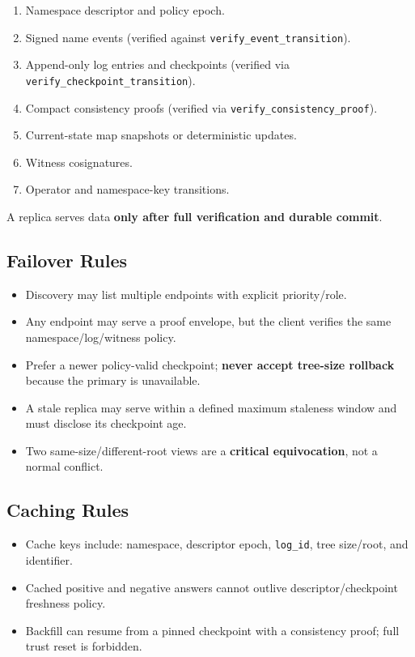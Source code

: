 \documentclass[
]{article}
\providecommand{\tightlist}{%
  \setlength{\itemsep}{0pt}\setlength{\parskip}{0pt}}
\begin{document}
\begin{enumerate}
\def\labelenumi{\arabic{enumi}.}
\tightlist
\item
  Namespace descriptor and policy epoch.
\item
  Signed name events (verified against
  \texttt{verify\_event\_transition}).
\item
  Append-only log entries and checkpoints (verified via
  \texttt{verify\_checkpoint\_transition}).
\item
  Compact consistency proofs (verified via
  \texttt{verify\_consistency\_proof}).
\item
  Current-state map snapshots or deterministic updates.
\item
  Witness cosignatures.
\item
  Operator and namespace-key transitions.
\end{enumerate}

A replica serves data \textbf{only after full verification and durable
commit}.

\hypertarget{failover-rules}{%
\subsection{Failover Rules}\label{failover-rules}}

\begin{itemize}
\tightlist
\item
  Discovery may list multiple endpoints with explicit priority/role.
\item
  Any endpoint may serve a proof envelope, but the client verifies the
  same namespace/log/witness policy.
\item
  Prefer a newer policy-valid checkpoint; \textbf{never accept tree-size
  rollback} because the primary is unavailable.
\item
  A stale replica may serve within a defined maximum staleness window
  and must disclose its checkpoint age.
\item
  Two same-size/different-root views are a \textbf{critical
  equivocation}, not a normal conflict.
\end{itemize}

\hypertarget{caching-rules}{%
\subsection{Caching Rules}\label{caching-rules}}

\begin{itemize}
\tightlist
\item
  Cache keys include: namespace, descriptor epoch, \texttt{log\_id},
  tree size/root, and identifier.
\item
  Cached positive and negative answers cannot outlive
  descriptor/checkpoint freshness policy.
\item
  Backfill can resume from a pinned checkpoint with a consistency proof;
  full trust reset is forbidden.
\end{itemize}
\end{document}

